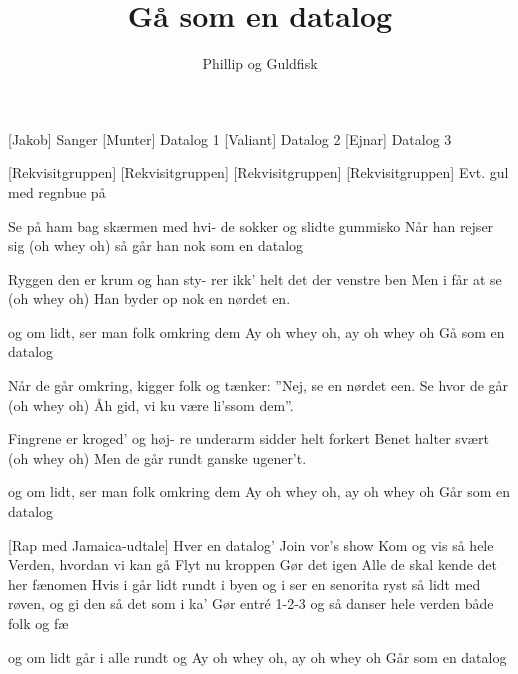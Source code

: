 \documentclass[a4paper,11pt]{article}
\title{Gå som en datalog}
\author{Phillip og Guldfisk}
\begin{document}
\maketitle

\begin{roles}  
[Jakob] Sanger
[Munter] Datalog 1
[Valiant] Datalog 2
[Ejnar] Datalog 3
\end{roles}

\begin{props}
[Rekvisitgruppen]
[Rekvisitgruppen]
[Rekvisitgruppen]
[Rekvisitgruppen] Evt. gul med regnbue på
\end{props}

\begin{song}

 Se på ham bag skærmen med hvi-
de sokker og slidte gummisko
Når han rejser sig (oh whey oh)
så går han nok som en datalog

 Ryggen den er krum og han sty-
rer ikk' helt det der venstre ben
Men i får at se (oh whey oh)
Han byder op nok en nørdet en.


 og om lidt, ser man folk omkring dem
Ay oh whey oh, ay oh whey oh
Gå som en datalog



 Når de går omkring, kigger folk
og tænker: ''Nej, se en nørdet een.
Se hvor de går (oh whey oh)
Åh gid, vi ku være li'ssom dem''.

 Fingrene er kroged' og høj-
re underarm sidder helt forkert
Benet halter svært (oh whey oh)
Men de går rundt ganske ugener't.

 og om lidt, ser man folk omkring dem
Ay oh whey oh, ay oh whey oh
Går som en datalog

[Rap med Jamaica-udtale] Hver en datalog'
Join vor's show
Kom og vis så hele Verden, hvordan vi kan gå
Flyt nu kroppen 
Gør det igen
Alle de skal kende det her fænomen
Hvis i går lidt rundt i byen og i ser en senorita
ryst så lidt med røven, og gi den så det som i ka'
Gør entré
1-2-3
og så danser hele verden både folk og fæ

 og om lidt går i alle rundt og
Ay oh whey oh, ay oh whey oh
Går som en datalog

\end{song}
\end{document}
